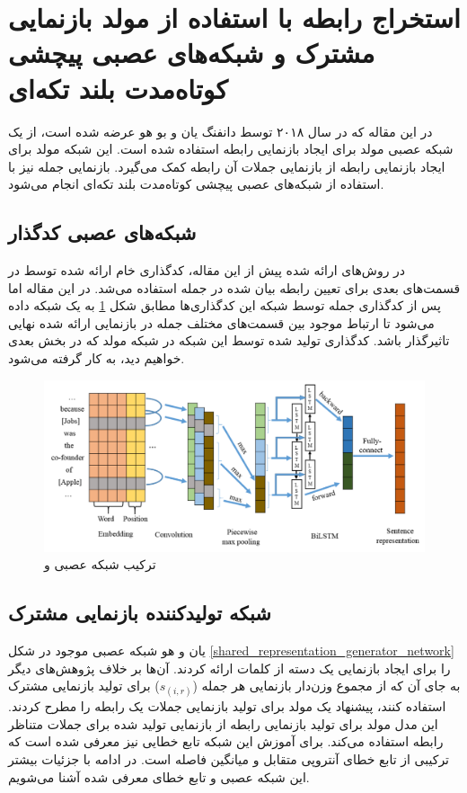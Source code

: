 \section{استخراج رابطه با استفاده از مولد بازنمایی مشترک و شبکه‌های عصبی پیچشی کوتاه‌مدت بلند تکه‌ای \cite{lstm-pcnn}}

در این مقاله که در سال ۲۰۱۸ توسط دانفنگ یان و بو هو عرضه شده است،
از یک شبکه عصبی مولد برای ایجاد بازنمایی‌ رابطه استفاده شده است. این شبکه مولد برای ایجاد بازنمایی رابطه از بازنمایی جملات
آن رابطه کمک می‌گیرد. بازنمایی جمله نیز با استفاده از
شبکه‌های عصبی پیچشی کوتاه‌مدت بلند تکه‌ای انجام می‌شود.

\subsection{شبکه‌های عصبی کد‌گذار}

در روش‌های ارائه شده پیش از این مقاله، کدگذاری خام ارائه شده توسط  در قسمت‌های بعدی برای تعیین
رابطه بیان شده در جمله استفاده می‌شد. در این مقاله اما پس از کدگذاری جمله توسط شبکه  این کدگذاری‌ها مطابق
شکل \ref{pcnn_lstm} به یک شبکه  داده می‌شود تا ارتباط موجود بین قسمت‌های مختلف جمله در بازنمایی ارائه شده نهایی
تاثیرگذار باشد. کدگذاری تولید شده توسط این شبکه در شبکه‌ مولد که در بخش بعدی خواهیم دید، به کار گرفته می‌شود.

\begin{figure}[h]
    \centering
    \includegraphics[width=0.8\linewidth]{images/shared/encoder.png}
    \caption{ترکیب شبکه عصبی  و }
    \label{pcnn_lstm}
\end{figure}

\subsection{شبکه تولید‌کننده بازنمایی مشترک}

یان و هو شبکه عصبی موجود در شکل \ref{shared_representation_generator_network} را برای ایجاد بازنمایی یک دسته
از کلمات ارائه کردند. آن‌ها بر خلاف پژوهش‌های دیگر به جای آن که از مجموع وزن‌دار بازنمایی هر جمله ($s_{(i,r)}$) برای تولید
بازنمایی مشترک استفاده کنند، پیشنهاد یک مولد برای تولید بازنمایی جملات یک رابطه را مطرح کردند. این مدل مولد برای تولید
بازنمایی رابطه از بازنمایی تولید شده برای جملات متناظر رابطه استفاده می‌کند. برای آموزش این شبکه تابع خطایی نیز
معرفی شده است که ترکیبی از تابع خطای آنتروپی متقابل و میانگین فاصله است.
در ادامه با جزئیات بیشتر این شبکه عصبی و تابع خطای معرفی شده آشنا می‌شویم.

